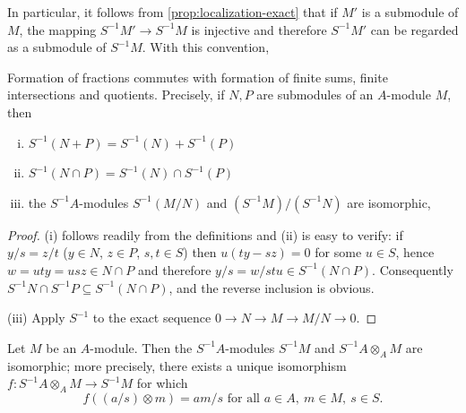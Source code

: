 In particular, it follows from \eqref{prop:localization-exact} that if $M'$ is a submodule of $M$, the mapping $S^{-1}M' \to S^{-1}M$ is injective and therefore $S^{-1}M'$ can be regarded as a submodule of $S^{-1}M$. With this convention,

\begin{corollary}\label{cor:localization-operations}
Formation of fractions commutes with formation of finite sums, finite intersections and quotients. Precisely, if $N, P$ are submodules of an $A$-module $M$, then
\begin{enumerate}[i)]
    \item $S^{-1}(N + P) = S^{-1}(N) + S^{-1}(P)$
    \item $S^{-1}(N \cap P) = S^{-1}(N) \cap S^{-1}(P)$
    \item the $S^{-1}A$-modules $S^{-1}(M/N)$ and $(S^{-1}M)/(S^{-1}N)$ are isomorphic,
\end{enumerate}
\end{corollary}

\begin{proof}
(i) follows readily from the definitions and (ii) is easy to verify: if $y/s = z/t$ ($y \in N$, $z \in P$, $s, t \in S$) then $u(ty - sz) = 0$ for some $u \in S$, hence $w = uty = usz \in N \cap P$ and therefore $y/s = w/stu \in S^{-1}(N \cap P)$. Consequently $S^{-1}N \cap S^{-1}P \subseteq S^{-1}(N \cap P)$, and the reverse inclusion is obvious.

(iii) Apply $S^{-1}$ to the exact sequence $0 \to N \to M \to M/N \to 0$.
\end{proof}

\begin{proposition}\label{prop:localization-tensor}
Let $M$ be an $A$-module. Then the $S^{-1}A$-modules $S^{-1}M$ and $S^{-1}A \otimes_A M$ are isomorphic; more precisely, there exists a unique isomorphism $f \colon S^{-1}A \otimes_A M \to S^{-1}M$ for which
\begin{equation}\label{eq:tensor-localization}
    f((a/s) \otimes m) = am/s \text{ for all } a \in A,\ m \in M,\ s \in S. \tag{1}
\end{equation}
\end{proposition}

